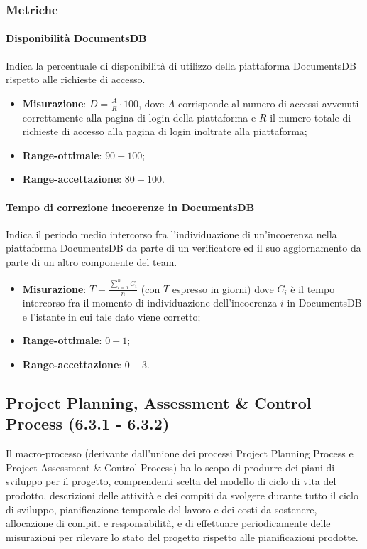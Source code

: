 \subsubsection{Metriche}
\paragraph{Disponibilità DocumentsDB}
\label{dispDocumentsDB}
Indica la percentuale di disponibilità di utilizzo della piattaforma DocumentsDB rispetto alle richieste di accesso.
\begin{itemize}
\item \textbf{Misurazione}: $ D = \frac{A}{R} \cdot 100 $, dove $A$ corrisponde al numero di accessi avvenuti correttamente alla pagina di login della piattaforma e $R$ il numero totale di richieste di accesso alla pagina di login inoltrate alla piattaforma;
\item \textbf{Range-ottimale}: $90 - 100$;
\item \textbf{Range-accettazione}: $80 - 100$.
\end{itemize}
\paragraph{Tempo di correzione incoerenze in DocumentsDB}
\label{tCorrIncoerDocumentsDB}
Indica il periodo medio intercorso fra l'individuazione di un'incoerenza nella piattaforma DocumentsDB da parte di un verificatore ed il suo aggiornamento da parte di un altro componente del team.
\begin{itemize}
\item \textbf{Misurazione}: $T = \frac{\sum_{i=1}^{n} C_{i}}{n}$ (con $T$ espresso in giorni) dove $C_{i}$ è il tempo intercorso fra il momento di individuazione dell'incoerenza $i$ in DocumentsDB e l'istante in cui tale dato viene corretto;
\item \textbf{Range-ottimale}: $0 - 1$;
\item \textbf{Range-accettazione}: $0 - 3$.
\end{itemize}

\subsection{Project Planning, Assessment \& Control Process (6.3.1 - 6.3.2)}
\label{projPlanAssControl}
Il macro-processo (derivante dall'unione dei processi Project Planning Process e Project Assessment \& Control Process) ha lo scopo di produrre dei piani di sviluppo per il progetto, comprendenti scelta del modello di ciclo di vita  del prodotto, descrizioni delle attività e dei compiti da svolgere durante tutto il ciclo di sviluppo, pianificazione temporale del lavoro e dei costi da sostenere, allocazione di compiti e responsabilità, e di effettuare periodicamente delle misurazioni per rilevare lo stato del progetto rispetto alle pianificazioni prodotte.
